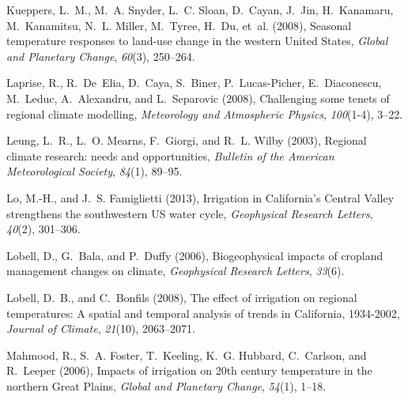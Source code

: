 \documentclass[draft,ms]{agutex}   %
\begin{document}
\begin{article}
\begin{thebibliography}{43}
Kueppers, L.~M., M.~A. Snyder, L.~C. Sloan, D.~Cayan, J.~Jin, H.~Kanamaru,
  M.~Kanamitsu, N.~L. Miller, M.~Tyree, H.~Du, et~al. (2008), {Seasonal
  temperature responses to land-use change in the western United States},
  \textit{Global and Planetary Change}, \textit{60}(3), 250--264.

Laprise, R., R.~De~Elia, D.~Caya, S.~Biner, P.~Lucas-Picher, E.~Diaconescu,
  M.~Leduc, A.~Alexandru, and L.~Separovic (2008), Challenging some tenets of
  regional climate modelling, \textit{Meteorology and Atmospheric Physics},
  \textit{100}(1-4), 3--22.

Leung, L.~R., L.~O. Mearns, F.~Giorgi, and R.~L. Wilby (2003), Regional climate
  research: needs and opportunities, \textit{Bulletin of the American
  Meteorological Society}, \textit{84}(1), 89--95.

Lo, M.-H., and J.~S. Famiglietti (2013), {Irrigation in California's Central
  Valley strengthens the southwestern US water cycle}, \textit{Geophysical
  Research Letters}, \textit{40}(2), 301--306.

Lobell, D., G.~Bala, and P.~Duffy (2006), Biogeophysical impacts of cropland
  management changes on climate, \textit{Geophysical Research Letters},
  \textit{33}(6).

Lobell, D.~B., and C.~Bonfils (2008), {The effect of irrigation on regional
  temperatures: A spatial and temporal analysis of trends in California,
  1934-2002}, \textit{Journal of Climate}, \textit{21}(10), 2063--2071.

Mahmood, R., S.~A. Foster, T.~Keeling, K.~G. Hubbard, C.~Carlson, and R.~Leeper
  (2006), {Impacts of irrigation on 20th century temperature in the northern
  Great Plains}, \textit{Global and Planetary Change}, \textit{54}(1), 1--18.


\end{thebibliography}
\end{article}
\end{document}
